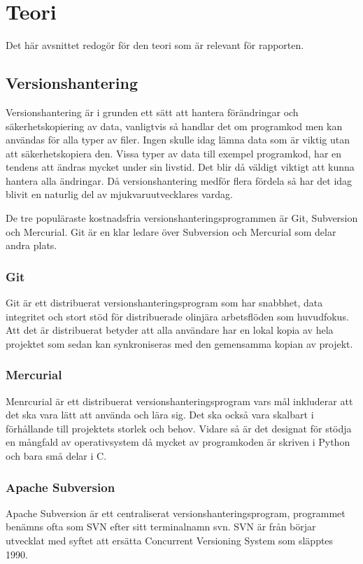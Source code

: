 \section{Teori}
Det här avsnittet redogör för den teori som är relevant för rapporten.
\subsection{Versionshantering}
Versionshantering är i grunden ett sätt att hantera förändringar och säkerhetskopiering av data, vanligtvis så handlar det om programkod men kan användas för alla typer av filer. Ingen skulle idag lämna data som är viktig utan att säkerhetskopiera den. Vissa typer av data till exempel programkod, har en tendens att ändras mycket under sin livstid. Det blir då väldigt viktigt att kunna hantera alla ändringar. Då versionshantering medför flera fördela så har det idag blivit en naturlig del av mjukvaruutvecklares vardag.\cite{VersionControlGit}

De tre populäraste kostnadsfria versionshanteringsprogrammen är Git, Subversion och Mercurial. Git är en klar ledare över Subversion och Mercurial som delar andra plats.\cite{version_comp}
\subsubsection{Git}
Git är ett distribuerat versionshanteringsprogram som har snabbhet, data integritet och stort stöd för distribuerade olinjära arbetsflöden som huvudfokus. Att det är distribuerat betyder att alla användare har en lokal kopia av hela projektet som sedan kan synkroniseras med den gemensamma kopian av projekt.\cite{VersionControlGit}\cite{web_Git}

\subsubsection{Mercurial}
Menrcurial är ett distribuerat versionshanteringsprogram vars mål inkluderar att det ska vara lätt att använda och lära sig. Det ska också vara skalbart i förhållande till projektets storlek och behov. Vidare så är det designat för stödja en mångfald av operativsystem då mycket av programkoden är skriven i Python och bara små delar i C.
\cite{VersionControlMercurial}\cite{VersionControlMercurial}


\subsubsection{Apache Subversion}
Apache Subversion är ett centraliserat versionshanteringsprogram, programmet benämns ofta som SVN efter sitt terminalnamn svn. SVN är från börjar utvecklat med syftet att ersätta Concurrent Versioning System som släpptes 1990.\cite{wiki_cvs}\cite{VersionControlSvn}\cite{web_Svn}


